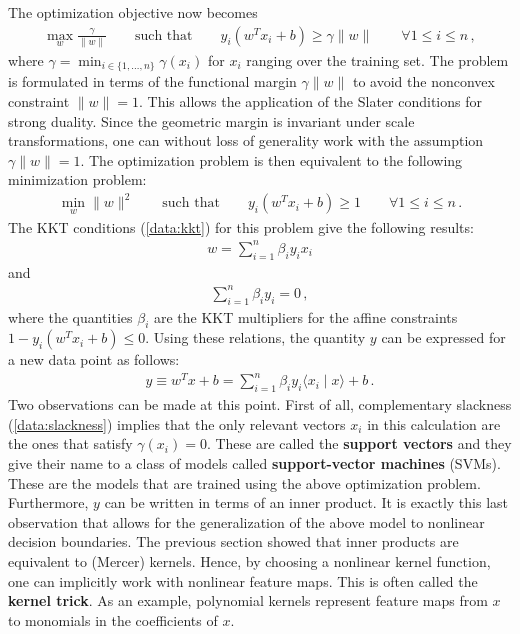     The optimization objective now becomes
    \begin{gather}
        \max_w\frac{\gamma}{\|w\|} \qquad\text{such that}\qquad  y_i(w^Tx_i+b)\geq\gamma\|w\|\qquad\forall 1\leq i\leq n\,,
    \end{gather}
    where $\gamma=\min_{i\in\{1,\ldots,n\}}\gamma(x_i)$ for $x_i$ ranging over the training set. The problem is formulated in terms of the functional margin $\gamma\|w\|$ to avoid the nonconvex constraint $\|w\|=1$. This allows the application of the Slater conditions for strong duality. Since the geometric margin is invariant under scale transformations, one can without loss of generality work with the assumption $\gamma\|w\|=1$. The optimization problem is then equivalent to the following minimization problem:
    \begin{gather}
        \min_w\|w\|^2 \qquad\text{such that}\qquad y_i(w^Tx_i+b)\geq1\qquad\forall 1\leq i\leq n\,.
    \end{gather}
    The KKT conditions (\cref{data:kkt}) for this problem give the following results:
    \begin{gather}
        w = \sum_{i=1}^n\beta_iy_ix_i
    \end{gather}
    and
    \begin{gather}
        \sum_{i=1}^n\beta_iy_i = 0\,,
    \end{gather}
    where the quantities $\beta_i$ are the KKT multipliers for the affine constraints $1-y_i(w^Tx_i+b)\leq0$. Using these relations, the quantity $y$ can be expressed for a new data point as follows:
    \begin{gather}
        y \equiv w^Tx + b = \sum_{i=1}^n\beta_iy_i\langle x_i\mid x \rangle + b\,.
    \end{gather}
    Two observations can be made at this point. First of all, complementary slackness (\cref{data:slackness}) implies that the only relevant vectors $x_i$ in this calculation are the ones that satisfy $\gamma(x_i)=0$. These are called the \textbf{support vectors} and they give their name to a class of models called \textbf{support-vector machines} (SVMs). These are the models that are trained using the above optimization problem. Furthermore, $y$ can be written in terms of an inner product. It is exactly this last observation that allows for the generalization of the above model to nonlinear decision boundaries. The previous section showed that inner products are equivalent to (Mercer) kernels. Hence, by choosing a nonlinear kernel function, one can implicitly work with nonlinear feature maps. This is often called the \textbf{kernel trick}. As an example, polynomial kernels represent feature maps from $x$ to monomials in the coefficients of $x$.


